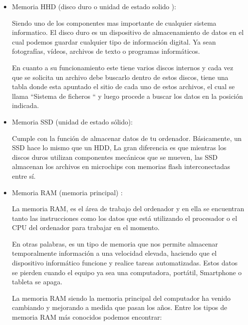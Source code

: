 \documentclass[12pt,oneside]{book}
\begin{document}
 \begin{itemize}
        \item { Memoria HHD (disco duro o unidad de estado solido )}:
        
        Siendo uno de los componentes mas importante de cualquier sistema informatico. El disco duro es un dispositivo de almacenamiento de datos en el cual podemos guardar cualquier tipo de información digital. Ya sean fotografías, vídeos, archivos de texto o programas informáticos.
        
        En cuanto a su funcionamiento este tiene varios discos internos y cada vez que se solicita un archivo debe buscarlo dentro de estos discos, tiene una tabla donde esta apuntado  el sitio de cada uno de estos archivos, el cual se llama “Sistema de ficheros “  y  luego procede a buscar los datos en la posición indicada.
        
         \item { Memoria SSD (unidad de estado sólido)}:
         
         Cumple con la función de almacenar datos de tu ordenador. Básicamente, un SSD hace lo mismo que un HDD, La gran diferencia es que mientras los discos duros utilizan componentes mecánicos que se mueven, las SSD almacenan los archivos en microchips con memorias flash interconectadas entre sí.
        
         \item { Memoria RAM (memoria principal) }:
         
         La memoria RAM, es el área de trabajo del ordenador y en ella se encuentran tanto las instrucciones  como los datos que está utilizando el procesador o el CPU del ordenador para trabajar en el momento.
         
         En otras palabras, es un tipo de memoria que nos permite almacenar temporalmente información a una velocidad elevada, haciendo que el dispositivo informático  funcione y realice tareas automatizadas. Estos datos se pierden cuando el equipo ya sea una computadora, portátil, Smartphone o tableta se apaga.  
         
         La memoria RAM siendo la memoria principal del computador ha venido cambiando y  mejorando a medida que pasan los años. Entre los tipos de memoria RAM más conocidos podemos encontrar:
         

\end{itemize}
\end{document}
